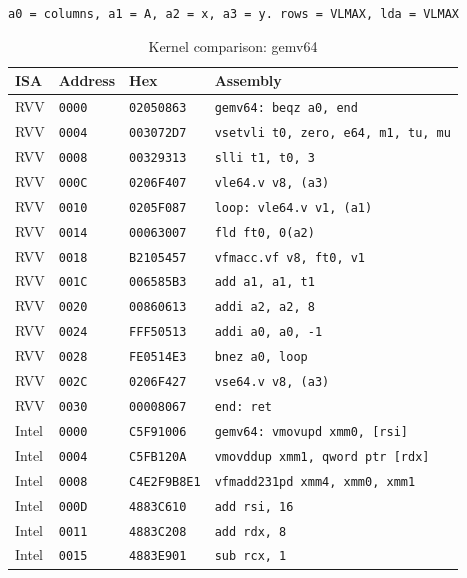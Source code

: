 \begin{table}[htbp]
\centering
\caption{Kernel comparison: gemv64}
\begingroup
\scriptsize
\setlength{\tabcolsep}{4pt}
\noindent \texttt{a0 = columns, a1 = A, a2 = x, a3 = y. rows = VLMAX, lda = VLMAX}\par
\vspace{0.6ex}
\begin{tabular}{@{}l|l|l|p{7.2cm}@{}}
\toprule
ISA & Address & Hex & Assembly \\
\midrule
RVV & \texttt{0000} & \texttt{02050863} & \texttt{gemv64: beqz a0, end} \\
RVV & \texttt{0004} & \texttt{003072D7} & \texttt{vsetvli t0, zero, e64, m1, tu, mu} \\
RVV & \texttt{0008} & \texttt{00329313} & \texttt{slli t1, t0, 3} \\
RVV & \texttt{000C} & \texttt{0206F407} & \texttt{vle64.v v8, (a3)} \\
RVV & \texttt{0010} & \texttt{0205F087} & \texttt{loop: vle64.v v1, (a1)} \\
RVV & \texttt{0014} & \texttt{00063007} & \texttt{fld ft0, 0(a2)} \\
RVV & \texttt{0018} & \texttt{B2105457} & \texttt{vfmacc.vf v8, ft0, v1} \\
RVV & \texttt{001C} & \texttt{006585B3} & \texttt{add a1, a1, t1} \\
RVV & \texttt{0020} & \texttt{00860613} & \texttt{addi a2, a2, 8} \\
RVV & \texttt{0024} & \texttt{FFF50513} & \texttt{addi a0, a0, -1} \\
RVV & \texttt{0028} & \texttt{FE0514E3} & \texttt{bnez a0, loop} \\
RVV & \texttt{002C} & \texttt{0206F427} & \texttt{vse64.v v8, (a3)} \\
RVV & \texttt{0030} & \texttt{00008067} & \texttt{end: ret} \\
\midrule
Intel & \texttt{0000} & \texttt{C5F91006} & \texttt{gemv64: vmovupd xmm0, [rsi]} \\
Intel & \texttt{0004} & \texttt{C5FB120A} & \texttt{vmovddup xmm1, qword ptr [rdx]} \\
Intel & \texttt{0008} & \texttt{C4E2F9B8E1} & \texttt{vfmadd231pd xmm4, xmm0, xmm1} \\
Intel & \texttt{000D} & \texttt{4883C610} & \texttt{add rsi, 16} \\
Intel & \texttt{0011} & \texttt{4883C208} & \texttt{add rdx, 8} \\
Intel & \texttt{0015} & \texttt{4883E901} & \texttt{sub rcx, 1} \\

\end{tabular}
\end{table}
